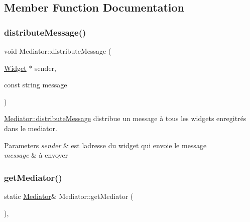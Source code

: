 \subsection{Member Function Documentation}
\mbox{\label{classMediator_a6d85bc8652e2fbd4f37b7ba67559c9e3}} 
\subsubsection{\texorpdfstring{distribute\+Message()}{distributeMessage()}}
{\footnotesize\ttfamily void Mediator\+::distribute\+Message (\begin{DoxyParamCaption}\item[{\hyperlink{classWidget}{Widget} $\ast$}]{sender,  }\item[{const string}]{message }\end{DoxyParamCaption})\hspace{0.3cm}{\ttfamily [virtual]}}



\hyperlink{classMediator_a6d85bc8652e2fbd4f37b7ba67559c9e3}{Mediator\+::distribute\+Message} distribue un message à tous les widgets enregitrés dans le mediator. 


\begin{DoxyParams}{Parameters}
{\em sender} & est l\textquotesingle{}adresse du widget qui envoie le message \\
\hline
{\em message} & à envoyer \\
\hline
\end{DoxyParams}
\mbox{\label{classMediator_a4f9ee710da1df5348e19a54ce4396952}} 
\subsubsection{\texorpdfstring{get\+Mediator()}{getMediator()}}
{\footnotesize\ttfamily static \hyperlink{classMediator}{Mediator}\& Mediator\+::get\+Mediator (\begin{DoxyParamCaption}{ }\end{DoxyParamCaption})\hspace{0.3cm}{\ttfamily [inline]}, {\ttfamily [static]}}



